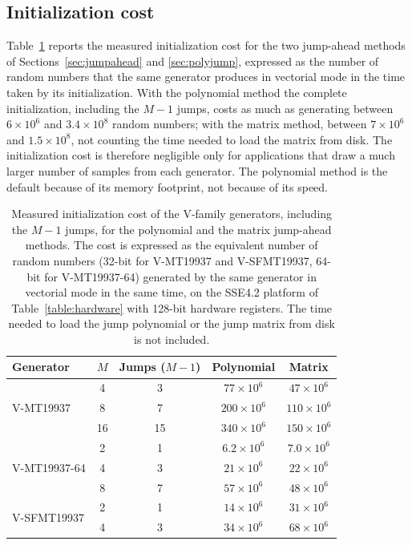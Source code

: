 \documentclass[preprint,1p,times]{elsarticle}
\begin{document}
\subsection{Initialization cost}
\label{sec:initcost}
Table~\ref{tab:initcost} reports the measured initialization cost for the two jump-ahead methods of Sections~\ref{sec:jumpahead} and \ref{sec:polyjump}, expressed as the number of random numbers that the same generator produces in vectorial mode in the time taken by its initialization. With the polynomial method the complete initialization, including the $M-1$ jumps, costs as much as generating between $6 \times 10^6$ and $3.4 \times 10^8$ random numbers; with the matrix method, between $7 \times 10^6$ and $1.5 \times 10^8$, not counting the time needed to load the matrix from disk. The initialization cost is therefore negligible only for applications that draw a much larger number of samples from each generator. The polynomial method is the default because of its memory footprint, not because of its speed.

\begin{table}[h!]
  \centering\small
  \renewcommand{\arraystretch}{1.2}
  \begin{tabular}{|l|c|c|c|c|}
    \hline
    \textbf{Generator} & $M$ & \textbf{Jumps} ($M-1$) & \textbf{Polynomial} & \textbf{Matrix} \\
    \hline
    \multirow{3}{*}{V-MT19937}    & 4  & 3  & $77 \times 10^6$  & $47 \times 10^6$  \\
                                  & 8  & 7  & $200 \times 10^6$ & $110 \times 10^6$ \\
                                  & 16 & 15 & $340 \times 10^6$ & $150 \times 10^6$ \\
    \hline
    \multirow{3}{*}{V-MT19937-64} & 2  & 1  & $6.2 \times 10^6$ & $7.0 \times 10^6$ \\
                                  & 4  & 3  & $21 \times 10^6$  & $22 \times 10^6$  \\
                                  & 8  & 7  & $57 \times 10^6$  & $48 \times 10^6$  \\
    \hline
    \multirow{2}{*}{V-SFMT19937}  & 2  & 1  & $14 \times 10^6$  & $31 \times 10^6$  \\
                                  & 4  & 3  & $34 \times 10^6$  & $68 \times 10^6$  \\
    \hline
  \end{tabular}
  \caption{\label{tab:initcost}Measured initialization cost of the V-family generators, including the $M-1$ jumps, for the polynomial and the matrix jump-ahead methods. The cost is expressed as the equivalent number of random numbers (32-bit for V-MT19937 and V-SFMT19937, 64-bit for V-MT19937-64) generated by the same generator in vectorial mode in the same time, on the SSE4.2 platform of Table~\ref{table:hardware} with 128-bit hardware registers. The time needed to load the jump polynomial or the jump matrix from disk is not included.}
\end{table}
\end{document}
